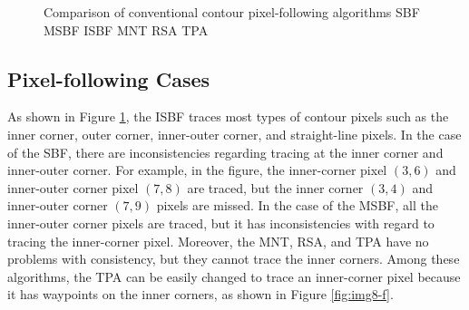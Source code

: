 \begin{figure}[htbp]
	 
	\caption{Comparison of conventional contour pixel-following algorithms \protect{} SBF \protect{} MSBF \protect{} ISBF \protect{} MNT \protect{} RSA \protect{} TPA}
	\label{fig:image8}
\end{figure}

\subsection{Pixel-following Cases}


As shown in Figure \ref{fig:image8}, the ISBF traces most types of contour pixels such as the inner corner, outer corner, inner-outer corner, and straight-line pixels. In the case of the SBF, there are inconsistencies regarding tracing at the inner corner and inner-outer corner. For example, in the figure, the inner-corner pixel $(3, 6)$ and inner-outer corner pixel $(7, 8)$ are traced, but the inner corner $(3, 4)$ and inner-outer corner $(7, 9)$ pixels are missed. In the case of the MSBF, all the inner-outer corner pixels are traced, but it has inconsistencies with regard to tracing the inner-corner pixel. Moreover, the MNT, RSA, and TPA have no problems with consistency, but they cannot trace the inner corners. Among these algorithms, the TPA can be easily changed to trace an inner-corner pixel because it has waypoints on the inner corners, as shown in Figure \ref{fig:img8-f}.




